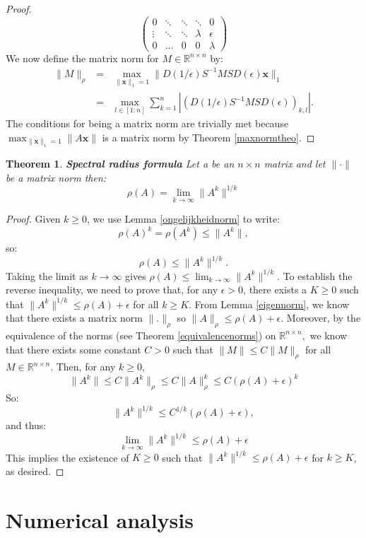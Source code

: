 \documentclass[a4paper,11pt]{report}
\newtheorem{theorem}{Theorem}[section]
\newcommand{\R}{{\mathbb R}}
\begin{document}
\begin{proof}
$$\begin{pmatrix}
  0 & \ddots & \ddots & \ddots & 0\\
  \vdots & \ddots & \ddots & \lambda & \epsilon\\
  0 & \ldots & 0 & 0 & \lambda  \end{pmatrix}$$
  We now define the matrix norm for $M \in \R^{n\times n}$ by:
  \begin{eqnarray}
    \|M\|_\rho &=& \max_{\|\mathbf{x}\|_1 = 1} \| 
    D(1/\epsilon)S^{-1}MSD(\epsilon)\mathbf{x}\|_1\\
    &=& \max_{l \in [1:n]} \sum^n_{k=1} 
    |(D(1/\epsilon)S^{-1}MSD(\epsilon))_{k,l}|.
 \end{eqnarray}
 The conditions for being a matrix norm are trivially met because $\max_{\|\mathbf{x}\|_1 = 1} \|A\mathbf{x}\|$ is a matrix norm by Theorem \ref{maxnormtheo}.
\end{proof}

\begin{theorem}\label{spectraalformula}\textbf{Spectral radius formula}
 Let a be an $n\times n$  matrix and  let $\|\cdot\|$ be a matrix norm then:
  $$\rho(A) = \lim_{k\to \infty} \|A^k\|^{1/k}$$
\end{theorem}
\begin{proof}
  Given $k \geq 0$, we use Lemma \ref{ongelijkheidnorm} to write:
  $$\rho(A)^k = \rho(A^k) \leq \|A^k\|,$$
  so:
  $$\rho(A) \leq \|A^k\|^{1/k}.$$
  Taking the limit as $k \to \infty$ gives $\rho(A) \leq \lim_{k\to 
  \infty}\|A^k\|^{1/k}$. To establish the reverse inequality, we need to prove 
  that, for any $\epsilon > 0$, there exists a $K \geq 0$ such that 
  $\|A^k\|^{1/k} \leq \rho(A) + \epsilon$ for all $k \geq K$. From Lemma \ref{eigennorm}, we know that
  there exists a matrix norm $\|.\|_\rho$ so $\|A\|_\rho \leq \rho(A) + \epsilon$. Moreover, by the equivalence of 
  the norms (see Theorem \ref{equivalencenorms}) on $\R^{n\times n},$ we know that there exists some constant $C  > 0$ such that 
  $\|M\| \leq C \|M\|_\rho$ for all $M \in \R^{n \times n}$. Then, for any $k \geq 0,$
    $$\|A^k\| \leq C\|A^k\|_\rho \leq C\|A\|_\rho^k \leq C(\rho(A)+\epsilon)^k$$
   So:
   $$ \|A^k\|^{1/k} \leq C^{1/k}(\rho(A)+\epsilon), $$
and thus:
$$\lim_{k\to \infty} \|A^k\|^{1/k} \leq \rho(A) + \epsilon$$
  This implies the existence of $K \geq 0$ such that $\|A^k\|^{1/k} \leq \rho(A) + \epsilon$ 
  for $k \geq K$, as desired.
 \end{proof}

\newpage
\section{Numerical analysis}
\end{document}
